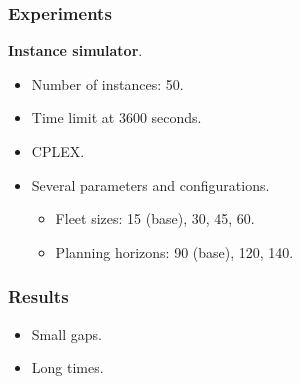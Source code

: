 \begin{frame}
\frametitle{\textbf{Experiments}}

  \textbf{Instance simulator}.
  \pause
  \begin{itemize}
    \item Number of instances: 50.  
    \item Time limit at 3600 seconds.
    \item CPLEX.
    \item Several parameters and configurations.
    \begin{itemize}
      \item Fleet sizes: 15 (base), 30, 45, 60.
      \item Planning horizons: 90 (base), 120, 140.
    \end{itemize}
  \end{itemize}
\end{frame}

\begin{frame}
\frametitle{\textbf{Results}}

  \begin{itemize}[<+->]
    \item Small gaps.
    \item Long times.
  \end{itemize}
  
\end{frame}

